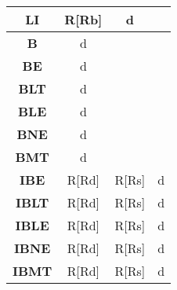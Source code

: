 \documentclass[a4paper,11pt,titlepage]{ltjsarticle}%
\begin{document}
\begin{table}[htbp]
\begin{tabular}{|c|c|c|c|}
\textbf{LI}   & R{[}Rb{]}     & d             &               \\ \hline
\textbf{B}    & d             &               &               \\ \hline
\textbf{BE}   & d             &               &               \\ \hline
\textbf{BLT}  & d             &               &               \\ \hline
\textbf{BLE}  & d             &               &               \\ \hline
\textbf{BNE}  & d             &               &               \\ \hline
\textbf{BMT}  & d             &               &               \\ \hline
\textbf{IBE}  & R{[}Rd{]}     & R{[}Rs{]}     & d             \\ \hline
\textbf{IBLT} & R{[}Rd{]}     & R{[}Rs{]}     & d             \\ \hline
\textbf{IBLE} & R{[}Rd{]}     & R{[}Rs{]}     & d             \\ \hline
\textbf{IBNE} & R{[}Rd{]}     & R{[}Rs{]}     & d             \\ \hline
\textbf{IBMT} & R{[}Rd{]}     & R{[}Rs{]}     & d             \\ \hline

\end{tabular}
\end{table}
\end{document}
